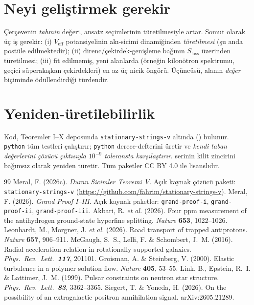 \documentclass[12pt,a4paper]{article}
\begin{document}
\section{Neyi geliştirmek gerekir}
Çerçevenin \emph{tahmin} değeri, ansatz seçimlerinin türetilmesiyle artar.
Somut olarak üç iş gerekir: (i) $V_{\mathrm{eff}}$ potansiyelinin
akı-sicimi dinamiğinden \emph{türetilmesi} (şu anda postüle edilmektedir);
(ii) direnc/çekirdek-genişleme bağının $S_{\mathrm{loss}}$ üzerinden
türetilmesi; (iii) fit edilmemiş, yeni alanlarda (örneğin kilonötron
spektrumu, geçici süperakışkan çekirdekleri) en az üç nicik öngörü.
Üçüncüsü, alanın \emph{değer} biçiminde ödüllendirdiği türdendir.

\section{Yeniden-üretilebilirlik}
Kod, Teoremler I--X deposunda \texttt{stationary-strings-v} altında
() bulunur. \texttt{python}
 tüm testleri çalıştırır; \texttt{python}
 derece-defterini üretir ve \emph{kendi taban
değerlerini çözücü çıktısıyla $10^{-9}$ toleransta karşılaştırır}.
 serinin kilit zincirini bağımsız olarak
yeniden türetir. Tüm paketler CC BY 4.0 ile lisanslıdır.

\begin{thebibliography}{99}
     Meral, F. (2026c). \textit{Duran Sicimler Teoremi V}.
    Açık kaynak çözücü paketi: \texttt{stationary-strings-v}
    (\url{https://github.com/fahrim/stationary-strings-v}).
     Meral, F. (2026). \textit{Grand Proof I--III}.
    Açık kaynak paketler: \texttt{grand-proof-i}, \texttt{grand-proof-ii},
    \texttt{grand-proof-iii}.
     Akbari, R. \textit{et al.} (2026). Four ppm measurement of
    the antihydrogen ground-state hyperfine splitting. \textit{Nature}
    \textbf{653}, 1022--1026.
     Leonhardt, M., Morgner, J. \textit{et al.} (2026). Road
    transport of trapped antiprotons. \textit{Nature} \textbf{657}, 906--911.
     McGaugh, S.~S., Lelli, F. \& Schombert, J.~M. (2016).
    Radial acceleration relation in rotationally supported galaxies.
    \textit{Phys.\ Rev.\ Lett.\ \textbf{117}}, 201101.
     Groisman, A. \& Steinberg, V. (2000). Elastic turbulence in
    a polymer solution flow. \textit{Nature} \textbf{405}, 53--55.
     Link, B., Epstein, R.~I. \& Lattimer, J.~M. (1999).
    Pulsar constraints on neutron star structure.
    \textit{Phys.\ Rev.\ Lett.\ \textbf{83}}, 3362--3365.
     Siegert, T. \& Yoneda, H. (2026). On the possibility of an
    extragalactic positron annihilation signal. arXiv:2605.21289.
\end{thebibliography}
\end{document}
